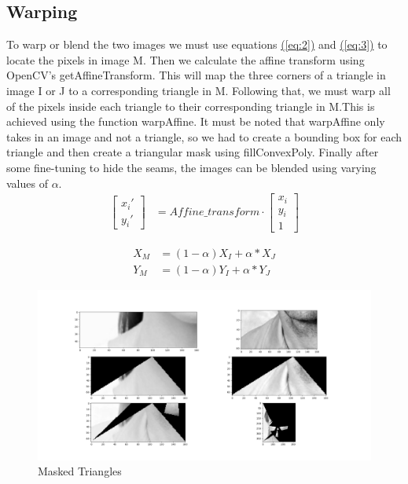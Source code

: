 \documentclass[journal]{IEEEtran}
\begin{document}
\subsection{Warping}
To warp or blend the two images we must use equations \hyperref[eq:2]{(\ref{eq:2})} and \hyperref[eq:3]{(\ref{eq:3})} to locate the pixels in image M. Then we calculate the affine transform using OpenCV’s getAffineTransform. This will map the three corners of a triangle in image I or J to a corresponding triangle in M. Following that, we must warp all of the pixels inside each triangle to their corresponding triangle in M.This is achieved using the function warpAffine. It must be noted that warpAffine only takes in an image and not a triangle, so we had to create a bounding box for each triangle and then create a triangular mask using fillConvexPoly.
Finally after some fine-tuning to hide the seams, the images can be blended using varying values of $\alpha$.
	\begin{align}
		\begin{bmatrix}
			x_i' \\ y_i'
		\end{bmatrix}
		&= Affine\_transform \cdot
		\begin{bmatrix}
			x_i \\ y_i \\ 1
		\end{bmatrix}
	\end{align}
	
\begin{align}\label{eq:2}
X_M &= (1-\alpha)X_I + \alpha*X_J\\ \label{eq:3} 
Y_M &= (1-\alpha)Y_I + \alpha*Y_J   
\end{align}

\begin{figure}[H]
	\includegraphics[width = \linewidth]{triangles}
	\caption{Masked Triangles}
\end{figure}
\end{document}
